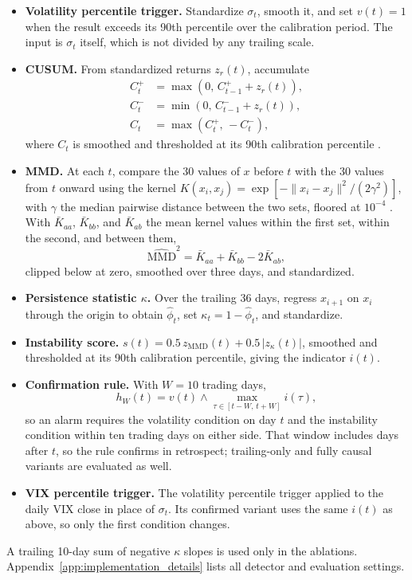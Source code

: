 \documentclass[pdflatex,sn-mathphys-num,iicol]{sn-jnl}
\begin{document}
\begin{itemize}
\item \textbf{Volatility percentile trigger.} Standardize $\sigma_t$, smooth it, and set $v(t)=1$ when the result exceeds its 90th percentile over the calibration period. The input is $\sigma_t$ itself, which is not divided by any trailing scale.
\item \textbf{CUSUM.} From standardized returns $z_r(t)$, accumulate
\begin{align}
C^+_t &= \max(0,\,C^+_{t-1}+z_r(t)),\\
C^-_t &= \min(0,\,C^-_{t-1}+z_r(t)),\\
C_t &= \max(C^+_t,\,-C^-_t),
\end{align}
where $C_t$ is smoothed and thresholded at its 90th calibration percentile \cite{page1954}.
\item \textbf{MMD.} At each $t$, compare the 30 values of $x$ before $t$ with the 30 values from $t$ onward using the kernel $K(x_i,x_j)=\exp[-\|x_i-x_j\|^2/(2\gamma^2)]$, with $\gamma$ the median pairwise distance between the two sets, floored at $10^{-4}$ \cite{gretton2012}. With $\bar K_{aa}$, $\bar K_{bb}$, and $\bar K_{ab}$ the mean kernel values within the first set, within the second, and between them,
\begin{equation}
\widehat{\mathrm{MMD}}^2=\bar K_{aa}+\bar K_{bb}-2\bar K_{ab},
\end{equation}
clipped below at zero, smoothed over three days, and standardized.
\item \textbf{Persistence statistic $\kappa$.} Over the trailing 36 days, regress $x_{i+1}$ on $x_i$ through the origin to obtain $\widehat\phi_t$, set $\kappa_t=1-\widehat\phi_t$, and standardize.
\item \textbf{Instability score.} $s(t)=0.5\,z_{\mathrm{MMD}}(t)+0.5\,|z_\kappa(t)|$, smoothed and thresholded at its 90th calibration percentile, giving the indicator $i(t)$.
\item \textbf{Confirmation rule.} With $W=10$ trading days,
\begin{equation}
h_W(t)=v(t)\wedge \max_{\tau\in[t-W,\,t+W]}i(\tau),
\end{equation}
so an alarm requires the volatility condition on day $t$ and the instability condition within ten trading days on either side. That window includes days after $t$, so the rule confirms in retrospect; trailing-only and fully causal variants are evaluated as well.
\item \textbf{VIX percentile trigger.} The volatility percentile trigger applied to the daily VIX close in place of $\sigma_t$. Its confirmed variant uses the same $i(t)$ as above, so only the first condition changes.
\end{itemize}
A trailing 10-day sum of negative $\kappa$ slopes is used only in the ablations. Appendix~\ref{app:implementation_details} lists all detector and evaluation settings.
\end{document}
